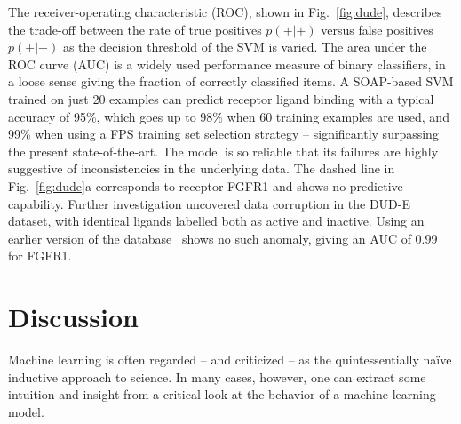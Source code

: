 \documentclass[12pt]{article}
\begin{document}
The receiver-operating characteristic (ROC), shown in Fig.~\ref{fig:dude}, describes the trade-off between the rate of true positives $p(+|+)$ versus false positives $p(+|-)$ as the decision threshold of the SVM is varied. The area under the ROC curve (AUC) is a widely used performance measure of binary classifiers, in a loose sense giving the fraction of correctly classified items. 
A SOAP-based SVM trained on just 20 examples can predict receptor ligand binding with a typical accuracy of 95\%, which goes up to 98\% when 60 training examples are used, and 99\% when using a FPS training set selection strategy -- 
%
%
significantly surpassing the present state-of-the-art\cite{skoda_benchmarking_2016,lee_predicting_2016,wallach_deep_2015}.
The model is so reliable that its failures are highly suggestive of inconsistencies in the underlying data. The dashed line in Fig.~\ref{fig:dude}a corresponds to receptor FGFR1 and shows no predictive capability. Further investigation uncovered data corruption in the DUD-E dataset, with identical ligands labelled both as active and inactive. Using an earlier version of the database~\cite{huang_benchmarking_2006} shows no such anomaly, giving an AUC of 0.99 for FGFR1.

%
%


\section{Discussion}

Machine learning is often regarded -- and criticized -- as the quintessentially
na\"ive inductive approach to science. In many cases, however, one
can extract some intuition and insight from a critical look at the behavior of a 
machine-learning model. 
\end{document}
